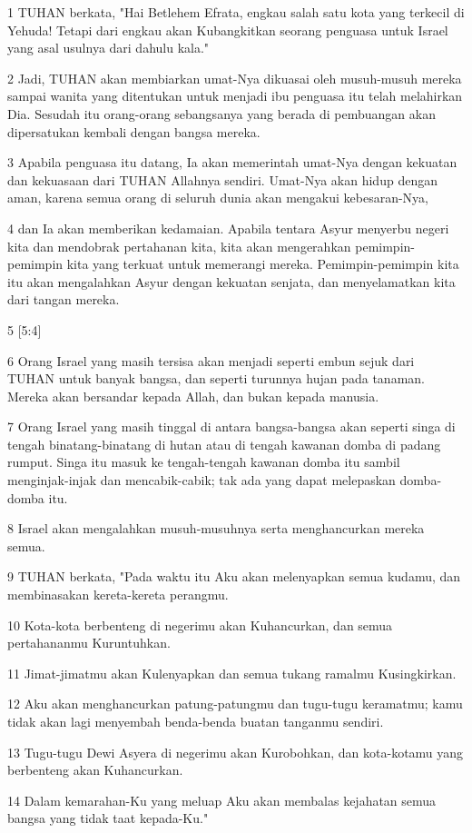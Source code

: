 \par 1 TUHAN berkata, "Hai Betlehem Efrata, engkau salah satu kota yang terkecil di Yehuda! Tetapi dari engkau akan Kubangkitkan seorang penguasa untuk Israel yang asal usulnya dari dahulu kala."
\par 2 Jadi, TUHAN akan membiarkan umat-Nya dikuasai oleh musuh-musuh mereka sampai wanita yang ditentukan untuk menjadi ibu penguasa itu telah melahirkan Dia. Sesudah itu orang-orang sebangsanya yang berada di pembuangan akan dipersatukan kembali dengan bangsa mereka.
\par 3 Apabila penguasa itu datang, Ia akan memerintah umat-Nya dengan kekuatan dan kekuasaan dari TUHAN Allahnya sendiri. Umat-Nya akan hidup dengan aman, karena semua orang di seluruh dunia akan mengakui kebesaran-Nya,
\par 4 dan Ia akan memberikan kedamaian. Apabila tentara Asyur menyerbu negeri kita dan mendobrak pertahanan kita, kita akan mengerahkan pemimpin-pemimpin kita yang terkuat untuk memerangi mereka. Pemimpin-pemimpin kita itu akan mengalahkan Asyur dengan kekuatan senjata, dan menyelamatkan kita dari tangan mereka.
\par 5 [5:4]
\par 6 Orang Israel yang masih tersisa akan menjadi seperti embun sejuk dari TUHAN untuk banyak bangsa, dan seperti turunnya hujan pada tanaman. Mereka akan bersandar kepada Allah, dan bukan kepada manusia.
\par 7 Orang Israel yang masih tinggal di antara bangsa-bangsa akan seperti singa di tengah binatang-binatang di hutan atau di tengah kawanan domba di padang rumput. Singa itu masuk ke tengah-tengah kawanan domba itu sambil menginjak-injak dan mencabik-cabik; tak ada yang dapat melepaskan domba-domba itu.
\par 8 Israel akan mengalahkan musuh-musuhnya serta menghancurkan mereka semua.
\par 9 TUHAN berkata, "Pada waktu itu Aku akan melenyapkan semua kudamu, dan membinasakan kereta-kereta perangmu.
\par 10 Kota-kota berbenteng di negerimu akan Kuhancurkan, dan semua pertahananmu Kuruntuhkan.
\par 11 Jimat-jimatmu akan Kulenyapkan dan semua tukang ramalmu Kusingkirkan.
\par 12 Aku akan menghancurkan patung-patungmu dan tugu-tugu keramatmu; kamu tidak akan lagi menyembah benda-benda buatan tanganmu sendiri.
\par 13 Tugu-tugu Dewi Asyera di negerimu akan Kurobohkan, dan kota-kotamu yang berbenteng akan Kuhancurkan.
\par 14 Dalam kemarahan-Ku yang meluap Aku akan membalas kejahatan semua bangsa yang tidak taat kepada-Ku."

